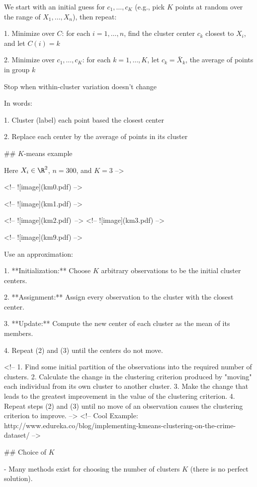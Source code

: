 We start with an initial guess for $c_1,\hdots , c_K$ (e.g., pick $K$
points at random over the range of $X_1,\hdots , X_n$), then repeat:

1.  Minimize over $C$: for each $i=1,\hdots , n$, find the
    cluster center $c_k$ closest to $X_i$, and let $C(i)=k$

2.  Minimize over $c_1,\hdots , c_K$: for each
    $k=1,\hdots , K$, let $c_k = \bar{X}_k$, the average of points in
    group $k$

Stop when within-cluster variation doesn’t change

In words:

1.  Cluster (label) each point based the closest center

2.  Replace each center by the average of points in its cluster

## $K$-means example

Here $X_i \in \R^2$, $n=300$, and $K=3$ -->

<!-- ![image](km0.pdf) -->

<!-- ![image](km1.pdf) -->

<!-- ![image](km2.pdf)\ -->
<!-- ![image](km3.pdf) -->

<!-- ![image](km9.pdf) -->

Use an approximation:

1. **Initialization:** Choose $K$ arbitrary observations to be the initial cluster
   centers.

2. **Assignment:** Assign every observation to the cluster with the closest center.

3. **Update:** Compute the new center of each cluster as the mean of its members.

4. Repeat (2) and (3) until the centers do not move.

<!--
1. Find some initial partition of the observations into the required number of clusters.
2. Calculate the change in the clustering criterion produced by "moving" each
individual from its own cluster to another cluster.
3. Make the change that leads to the greatest improvement in the value of the clustering criterion.
4. Repeat steps (2) and (3) until no move of an observation causes the clustering criterion to improve.
-->
<!-- Cool Example: http://www.edureka.co/blog/implementing-kmeans-clustering-on-the-crime-dataset/ -->


## Choice of $K$

- Many methods exist for choosing the number of clusters $K$ (there is no perfect solution).

